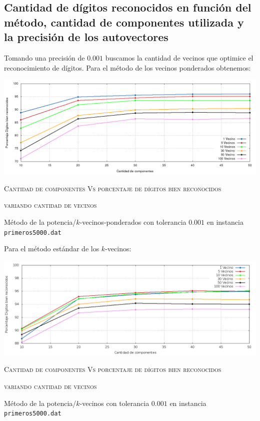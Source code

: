 	\subsection{Cantidad de d\'igitos reconocidos en funci\'on del m\'etodo,
	cantidad de componentes utilizada y la precisi\'on de los autovectores}

		Tomando una precisi\'on de $0.001$ buscamos la cantidad de vecinos que
		optimice el reconocimiento de d\'igitos.
		Para el m\'etodo de los vecinos ponderados obtenemos:

		\vspace{5mm}
		\centerline{\includegraphics[width=20cm]{img/kPonderadosPS.png}}
		\centerline{\textsc{Cantidad de componentes Vs porcentaje de d\'igitos bien
		reconocidos}}
		\centerline{\textsc{variando cantidad de vecinos}}
		\centerline{M\'etodo de la potencia/$k$-vecinos-ponderados con tolerancia
		$0.001$ en instancia \texttt{primeros5000.dat}}
		\vspace{5mm}

		Para el m\'etodo est\'andar de los $k$-vecinos:

		\vspace{5mm}
		\centerline{\includegraphics[width=20cm]{img/kVecinosPS.png}}
		\centerline{\textsc{Cantidad de componentes Vs porcentaje de d\'igitos bien
		reconocidos}}
		\centerline{\textsc{variando cantidad de vecinos}}
		\centerline{M\'etodo de la potencia/$k$-vecinos con tolerancia $0.001$ en instancia
		\texttt{primeros5000.dat}}
		\vspace{5mm}

